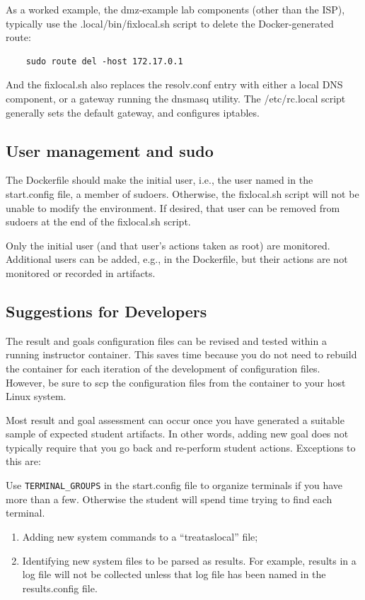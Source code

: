 \documentclass[12pt]{article}
\begin{document}
As a worked example, the dmz-example lab components (other than the ISP), typically use the .local/bin/fixlocal.sh script to 
delete the Docker-generated route:
\begin{verbatim}
    sudo route del -host 172.17.0.1
\end{verbatim}
\noindent And the fixlocal.sh also replaces the resolv.conf entry with either a local DNS component, or a gateway running
the dnsmasq utility.  The /etc/rc.local script generally sets the default gateway, and configures iptables.

\subsection{User management and sudo}
The Dockerfile should make the initial user, i.e., the user named in the start.config file, a member of sudoers.
Otherwise, the fixlocal.sh script will not be unable to modify the environment.  If desired, that user can be
removed from sudoers at the end of the fixlocal.sh script.

Only the initial user (and that user's actions taken as root) are monitored.  Additional users can be added,
e.g., in the Dockerfile, but their actions are not monitored or recorded in artifacts.


\subsection{Suggestions for Developers}
The result and goals configuration files can be revised and tested within a
running instructor container.  This saves time because you do not need to rebuild
the container for each iteration of the development of configuration files.  However,
be sure to scp the configuration files from the container to your host Linux system.

Most result and goal assessment can occur once you have generated a suitable sample of
expected student artifacts.  In other words, adding new goal does not typically require
that you go back and re-perform student actions.  Exceptions to this are:

Use {\tt TERMINAL\_GROUPS} in the start.config file to organize terminals if you have more
than a few.  Otherwise the student will spend time trying to find each terminal.

\begin{enumerate}
\item Adding new system commands to a ``treataslocal'' file;
\item Identifying new system files to be parsed as results.  For example, results in a log
file will not be collected unless that log file has been named in the results.config file.
\end{enumerate}
\end{document}
